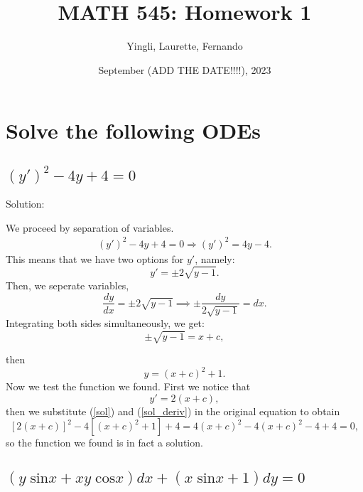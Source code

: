 \documentclass{article}
\title{MATH 545: Homework 1}
\author{Yingli, Laurette, Fernando}
\date{September (ADD THE DATE!!!!), 2023}
\begin{document}
\maketitle
\section{Solve the following ODEs}
\subsection{$(y')^2 -4y +4 = 0$}

		Solution:

		We proceed by separation of variables.
		\begin{align*}
			(y')^2 -4y +4 = 0 \Longrightarrow (y')^2 = 4y -4. %
		\end{align*}
		This means that we have two options for $y'$, namely:
		\[y' = \pm 2\sqrt{y-1}.\]
	Then, we seperate variables,
	\[ \frac{dy}{dx} = \pm 2\sqrt{y-1} \implies \pm\frac{dy}{ 2\sqrt{y-1}} = dx.\]
		Integrating both sides simultaneously, we get:
		\[\pm \sqrt{y-1} = x+c,\]

		then
		\begin{equation} \label{sol}
			y = (x+c)^2 + 1.
		\end{equation}
		Now we test the function we found. First we notice that
		\begin{equation} \label{sol_deriv}
			y' = 2(x+c),
		\end{equation}
		then we substitute (\ref{sol}) and (\ref{sol_deriv}) in the original equation to obtain
		\[ [2(x+c)]^2 -4[(x+c)^2 + 1] +4= 4(x+c)^2 -4(x+c)^2 -4 + 4 =0,\]
		so the function we found is in fact a solution.

\subsection{$(y\;\text{sin} x + xy\;\text{cos}x)dx + (x\;\text{sin}x + 1)dy = 0$}
\end{document}
